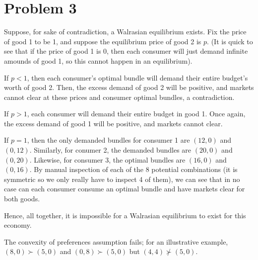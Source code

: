 \documentclass[10pt,letter]{article}
\begin{document}
\section*{Problem 3}
Suppose, for sake of contradiction, a Walrasian equilibrium exists. Fix the price of good 1 to be 1, and suppose the equilibrium price of good 2 is $p$. (It is quick to see that if the price of good 1 is 0, then each consumer will just demand infinite amounds of good 1, so this cannot happen in an equilibrium).

If $p < 1$, then each consumer's optimal bundle will demand their entire budget's worth of good 2. Then, the excess demand of good 2 will be positive, and markets cannot clear at these prices and consumer optimal bundles, a contradiction.

If $p > 1$, each consumer will demand their entire budget in good 1. Once again, the excess demand of good 1 will be positive, and markets cannot clear.

If $p = 1$, then the only demanded bundles for consumer 1 are $(12,0)$ and $(0, 12)$. Similarly, for conumer 2, the demanded bundles are $(20, 0)$ and $(0, 20)$. Likewise, for consumer 3, the optimal bundles are $(16,0)$ and $(0,16)$. By manual inspection of each of the 8 potential combinations (it is symmetric so we only really have to inspect 4 of them), we can see that in no case can each consumer consume an optimal bundle and have markets clear for both goods.

Hence, all together, it is impossible for a Walrasian equilibrium to exist for this economy.

The convexity of preferences assumption fails; for an illustrative example, $(8,0) \succ (5,0)$ and $(0,8) \succ (5,0)$ but $(4,4) \not \succ (5,0)$.
\end{document}
